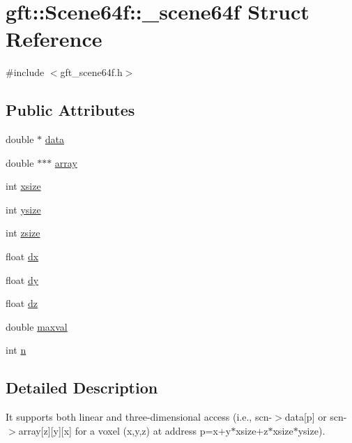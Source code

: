 \hypertarget{structgft_1_1Scene64f_1_1__scene64f}{\section{gft\-:\-:Scene64f\-:\-:\-\_\-scene64f Struct Reference}
\label{structgft_1_1Scene64f_1_1__scene64f}
}


{\ttfamily \#include $<$gft\-\_\-scene64f.\-h$>$}

\subsection*{Public Attributes}
\begin{DoxyCompactItemize}
\item 
double $\ast$ \hyperlink{structgft_1_1Scene64f_1_1__scene64f_aec3e25514ed6095fe591edf9a1236784}{data}
\item 
double $\ast$$\ast$$\ast$ \hyperlink{structgft_1_1Scene64f_1_1__scene64f_a5915e77353237ae4daf712e117c7e2c6}{array}
\item 
int \hyperlink{structgft_1_1Scene64f_1_1__scene64f_a70afaf6bd167e7ee4b2d7394d7636fce}{xsize}
\item 
int \hyperlink{structgft_1_1Scene64f_1_1__scene64f_a380678d21dc4a7187306550e9104d167}{ysize}
\item 
int \hyperlink{structgft_1_1Scene64f_1_1__scene64f_a1246232c6a1828badcc862f6dc3259a9}{zsize}
\item 
float \hyperlink{structgft_1_1Scene64f_1_1__scene64f_adde0de68578a6d948d2fcbd6b82fbaa7}{dx}
\item 
float \hyperlink{structgft_1_1Scene64f_1_1__scene64f_a649207f750770bc555947752003b2ef1}{dy}
\item 
float \hyperlink{structgft_1_1Scene64f_1_1__scene64f_a97bbee03871a9d6845d280222c58a130}{dz}
\item 
double \hyperlink{structgft_1_1Scene64f_1_1__scene64f_aa3a9cc2ce61f403b1cfd906226699513}{maxval}
\item 
int \hyperlink{structgft_1_1Scene64f_1_1__scene64f_ab7464ba36e23d53135dcab4e369e591f}{n}
\end{DoxyCompactItemize}


\subsection{Detailed Description}
It supports both linear and three-\/dimensional access (i.\-e., scn-\/$>$data\mbox{[}p\mbox{]} or scn-\/$>$array\mbox{[}z\mbox{]}\mbox{[}y\mbox{]}\mbox{[}x\mbox{]} for a voxel (x,y,z) at address p=x+y$\ast$xsize+z$\ast$xsize$\ast$ysize). 

